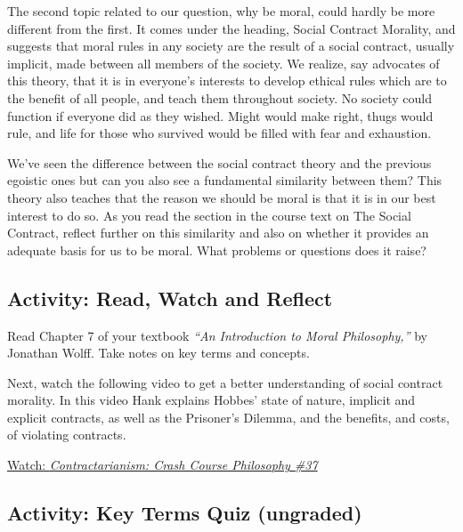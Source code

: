 \documentclass[
]{book}
\begin{document}
The second topic related to our question, why be moral, could hardly be more different from the first. It comes under the heading, Social Contract Morality, and suggests that moral rules in any society are the result of a social contract, usually implicit, made between all members of the society. We realize, say advocates of this theory, that it is in everyone's interests to develop ethical rules which are to the benefit of all people, and teach them throughout society. No society could function if everyone did as they wished. Might would make right, thugs would rule, and life for those who survived would be filled with fear and exhaustion.

We've seen the difference between the social contract theory and the previous egoistic ones but can you also see a fundamental similarity between them? This theory also teaches that the reason we should be moral is that it is in our best interest to do so. As you read the section in the course text on The Social Contract, reflect further on this similarity and also on whether it provides an adequate basis for us to be moral. What problems or questions does it raise?

\hypertarget{activity-read-watch-and-reflect-4}{%
\subsection*{Activity: Read, Watch and Reflect}\label{activity-read-watch-and-reflect-4}}

\begin{reflect}
Read Chapter 7 of your textbook \emph{``An Introduction to Moral Philosophy,''} by Jonathan Wolff. Take notes on key terms and concepts.

Next, watch the following video to get a better understanding of social contract morality. In this video Hank explains Hobbes' state of nature, implicit and explicit contracts, as well as the Prisoner's Dilemma, and the benefits, and costs, of violating contracts.

\href{https://www.youtube.com/watch?v=2Co6pNvd9mc}{Watch: \emph{Contractarianism: Crash Course Philosophy \#37}}
\end{reflect}

\hypertarget{activity-key-terms-quiz-ungraded-1}{%
\subsection*{Activity: Key Terms Quiz (ungraded)}\label{activity-key-terms-quiz-ungraded-1}}
\end{document}
